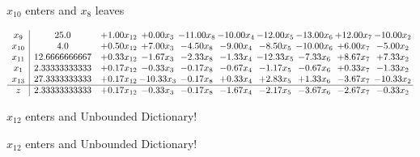 \documentclass[9pt]{article}
\begin{document}
 $ x_{10} $ enters and $ x_{8} $ leaves 

 \[\begin{array}{c| c c@{\hskip 2pt} c@{\hskip 2pt} c@{\hskip 2pt} c@{\hskip 2pt} c@{\hskip 2pt} c@{\hskip 2pt} c@{\hskip 2pt} c@{\hskip 2pt} }
 x_{9}   &  25.0 & +  1.00 x_{12} & +  0.00 x_{3} & -11.00 x_{8} & -10.00 x_{4} & -12.00 x_{5} & -13.00 x_{6} & + 12.00 x_{7} & -10.00 x_{2}\\
 x_{10}   &  4.0 & +  0.50 x_{12} & +  7.00 x_{3} & -4.50 x_{8} & -9.00 x_{4} & -8.50 x_{5} & -10.00 x_{6} & +  6.00 x_{7} & -5.00 x_{2}\\
 x_{11}   &  12.6666666667 & +  0.33 x_{12} & -1.67 x_{3} & -2.33 x_{8} & -1.33 x_{4} & -12.33 x_{5} & -7.33 x_{6} & +  8.67 x_{7} & +  7.33 x_{2}\\
 x_{1}   &  2.33333333333 & +  0.17 x_{12} & -0.33 x_{3} & -0.17 x_{8} & -0.67 x_{4} & -1.17 x_{5} & -0.67 x_{6} & +  0.33 x_{7} & -1.33 x_{2}\\
 x_{13}   &  27.3333333333 & +  0.17 x_{12} & -10.33 x_{3} & -0.17 x_{8} & +  0.33 x_{4} & +  2.83 x_{5} & +  1.33 x_{6} & -3.67 x_{7} & -10.33 x_{2}\\
\hline
z    &  2.33333333333 & +  0.17 x_{12} & -0.33 x_{3} & -0.17 x_{8} & -1.67 x_{4} & -2.17 x_{5} & -3.67 x_{6} & -2.67 x_{7} & -0.33 x_{2}\\
\end{array}\]


 $ x_{12} $ enters and Unbounded Dictionary!


 $ x_{12} $ enters and Unbounded Dictionary!
\end{document}
